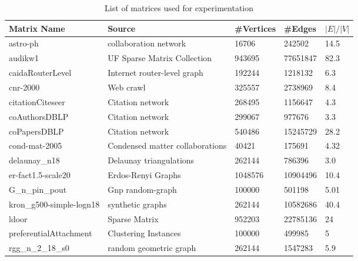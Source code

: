 \begin{table*}[ht]
\centering
\caption{List of matrices used for experimentation}
\label{tab:graphs}
\begin{tabular}{l|llll}
\toprule 
Matrix Name              & Source                          & \#Vertices & \#Edges  & $|E|/|V|$ \\
\midrule 
astro-ph                 & collaboration network           & 16706      & 242502   & 14.5      \\
audikw1                  & UF Sparse Matrix Collection     & 943695     & 77651847 & 82.3      \\
caidaRouterLevel         & Internet router-level graph     & 192244     & 1218132  & 6.3       \\
cnr-2000                 & Web crawl                       & 325557     & 2738969  & 8.4       \\
citationCiteseer         & Citation network                & 268495     & 1156647  & 4.3       \\
coAuthorsDBLP            & Citation network                & 299067     & 977676   & 3.3       \\
coPapersDBLP             & Citation network                & 540486     & 15245729 & 28.2      \\
cond-mat-2005            & Condensed matter collaborations & 40421      & 175691   & 4.32      \\
delaunay\_n18            & Delaunay triangulations         & 262144     & 786396   & 3.0       \\
er-fact1.5-scale20       & Erdos-Renyi Graphs              & 1048576    & 10904496 & 10.4      \\
G\_n\_pin\_pout          & Gnp random-graph                & 100000     & 501198   & 5.01      \\
kron\_g500-simple-logn18 & synthetic graphs                & 262144     & 10582686 & 40.4      \\
ldoor                    & Sparse Matrix                   & 952203     & 22785136 & 24        \\
preferentialAttachment   & Clustering Instances            & 100000     & 499985   & 5         \\
rgg\_n\_2\_18\_s0        & random geometric graph          & 262144     & 1547283  & 5.9      \\

\bottomrule 
\end{tabular}
\end{table*}